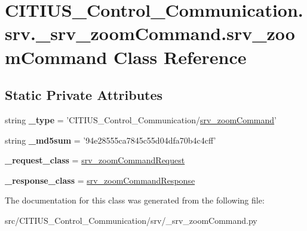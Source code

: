 \hypertarget{class_c_i_t_i_u_s___control___communication_1_1srv_1_1__srv__zoom_command_1_1srv__zoom_command}{\section{\-C\-I\-T\-I\-U\-S\-\_\-\-Control\-\_\-\-Communication.\-srv.\-\_\-srv\-\_\-zoom\-Command.\-srv\-\_\-zoom\-Command \-Class \-Reference}
\label{class_c_i_t_i_u_s___control___communication_1_1srv_1_1__srv__zoom_command_1_1srv__zoom_command}
}
\subsection*{\-Static \-Private \-Attributes}
\begin{DoxyCompactItemize}
\item 
\hypertarget{class_c_i_t_i_u_s___control___communication_1_1srv_1_1__srv__zoom_command_1_1srv__zoom_command_ad854f45d7829bb18add283a5cc3a4f95}{string {\bfseries \-\_\-type} = '\-C\-I\-T\-I\-U\-S\-\_\-\-Control\-\_\-\-Communication/\hyperlink{class_c_i_t_i_u_s___control___communication_1_1srv_1_1__srv__zoom_command_1_1srv__zoom_command}{srv\-\_\-zoom\-Command}'}\label{class_c_i_t_i_u_s___control___communication_1_1srv_1_1__srv__zoom_command_1_1srv__zoom_command_ad854f45d7829bb18add283a5cc3a4f95}

\item 
\hypertarget{class_c_i_t_i_u_s___control___communication_1_1srv_1_1__srv__zoom_command_1_1srv__zoom_command_a86f983c13072b222b2ece2979429fd60}{string {\bfseries \-\_\-md5sum} = '94e28555ca7845c55d04dfa70b4c4cff'}\label{class_c_i_t_i_u_s___control___communication_1_1srv_1_1__srv__zoom_command_1_1srv__zoom_command_a86f983c13072b222b2ece2979429fd60}

\item 
\hypertarget{class_c_i_t_i_u_s___control___communication_1_1srv_1_1__srv__zoom_command_1_1srv__zoom_command_a8f7381f16c79f6d0c244039d61f88c73}{{\bfseries \-\_\-request\-\_\-class} = \hyperlink{class_c_i_t_i_u_s___control___communication_1_1srv_1_1__srv__zoom_command_1_1srv__zoom_command_request}{srv\-\_\-zoom\-Command\-Request}}\label{class_c_i_t_i_u_s___control___communication_1_1srv_1_1__srv__zoom_command_1_1srv__zoom_command_a8f7381f16c79f6d0c244039d61f88c73}

\item 
\hypertarget{class_c_i_t_i_u_s___control___communication_1_1srv_1_1__srv__zoom_command_1_1srv__zoom_command_a8b8d93a06920fa6eaf83ad6e09c85330}{{\bfseries \-\_\-response\-\_\-class} = \hyperlink{class_c_i_t_i_u_s___control___communication_1_1srv_1_1__srv__zoom_command_1_1srv__zoom_command_response}{srv\-\_\-zoom\-Command\-Response}}\label{class_c_i_t_i_u_s___control___communication_1_1srv_1_1__srv__zoom_command_1_1srv__zoom_command_a8b8d93a06920fa6eaf83ad6e09c85330}

\end{DoxyCompactItemize}


\-The documentation for this class was generated from the following file\-:\begin{DoxyCompactItemize}
\item 
src/\-C\-I\-T\-I\-U\-S\-\_\-\-Control\-\_\-\-Communication/srv/\-\_\-srv\-\_\-zoom\-Command.\-py\end{DoxyCompactItemize}
